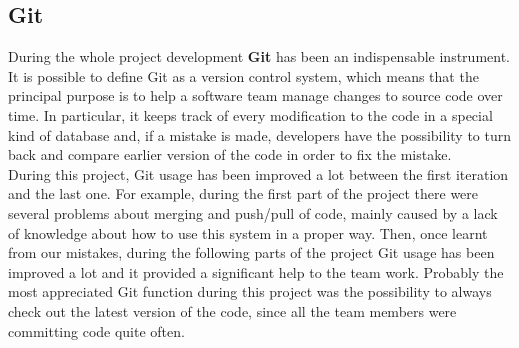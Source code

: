 	\subsection{Git}
	\vspace{-5mm}
During the whole project development \textbf{Git} has been an indispensable instrument.\\
It is possible to define Git as a version control system, which means that the principal purpose is to help a software team manage changes to source code over time. In particular, it keeps track of every modification to the code in a special kind of database and, if a mistake is made, developers have the possibility to turn back and compare earlier version of the code in order to fix the mistake.\cite{versionController}\\
During this project, Git usage has been improved a lot between the first iteration and the last one. For example, during the first part of the project there were several problems about merging and push/pull of code, mainly caused by a lack of knowledge about how to use this system in a proper way. Then, once learnt from our mistakes, during the following parts of the project Git usage has been improved a lot and it provided a significant help to the team work. Probably the most appreciated Git function during this project was the possibility to always check out the latest version of the code, since all the team members were committing code quite often.

